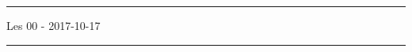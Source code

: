 \documentclass[a4paper]{article}
\makeatletter
\renewcommand{\section}{\@startsection{section}{1}{0mm}%
                                {-1ex plus -.5ex minus -.2ex}%
                                {0.5ex plus .2ex}%
                                {\normalfont\large\bfseries}}
\renewcommand{\subsection}{\@startsection{subsection}{2}{0mm}%
                                {-1ex plus -.5ex minus -.2ex}%
                                {-0.5ex plus .2ex}%
                                {\normalfont\bfseries}}
\makeatother
\begin{document}


\footnotesize
\begin{multicols}{2}
  \setlength{\premulticols}{1pt}
  \setlength{\postmulticols}{1pt}
  \setlength{\multicolsep}{2pt}
  \setlength{\columnsep}{8pt}

  
  \begin{center}{\centering \rule{0.3\linewidth}{0.25pt} Les 00 - 2017-10-17 \rule{0.3\linewidth}{0.25pt}}\end{center}


  \clearpage
\end{multicols}
\end{document}
